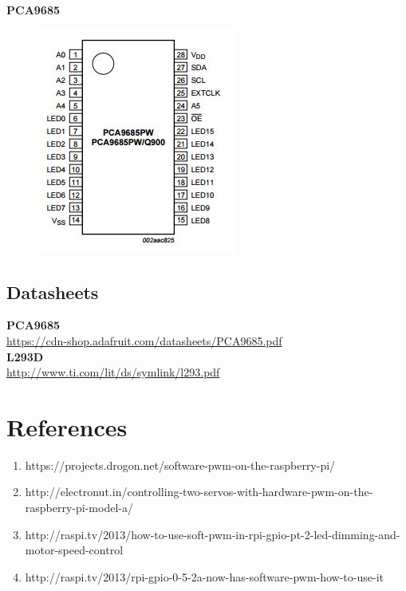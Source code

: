 \documentclass[11pt,a4paper]{article}
\begin{document}
	\textbf{PCA9685}  
	\begin{figure}[h!]
		\includegraphics[scale=0.8]{pin_pca9685.jpg}
		\centering
	\end{figure} 
	\subsection{Datasheets}
	\textbf{PCA9685} \\
	\url{https://cdn-shop.adafruit.com/datasheets/PCA9685.pdf}\\
	\textbf{L293D}\\
	\url{http://www.ti.com/lit/ds/symlink/l293.pdf}
	\section{References}
	\begin{enumerate}
		\item https://projects.drogon.net/software-pwm-on-the-raspberry-pi/
		\item http://electronut.in/controlling-two-servos-with-hardware-pwm-on-the-raspberry-pi-model-a/
		\item http://raspi.tv/2013/how-to-use-soft-pwm-in-rpi-gpio-pt-2-led-dimming-and-motor-speed-control
		\item http://raspi.tv/2013/rpi-gpio-0-5-2a-now-has-software-pwm-how-to-use-it
	\end{enumerate}
	
\end{document}

